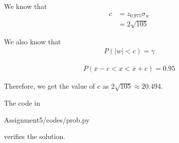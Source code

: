 \documentclass{beamer}
\begin{document}
\begin{frame}

We know that
\begin{align}
c &= z_{0.975} \sigma _w \\
&= 2 \sqrt{105}
\end{align}

We also know that
\begin{align}
P(|w| < c) = \gamma
\end{align}

\begin{align}
P(\overline{x} - c < x < \overline{x} + c) = 0.95
\end{align}

\end{frame}

\begin{frame}

Therefore, we get the value of $c$ as $2\sqrt{105} \approx 20.494$.

The code in
\begin{block}{}
Assignment5/codes/prob.py
\end{block}
verifies the solution.

\end{frame}
\end{document}
